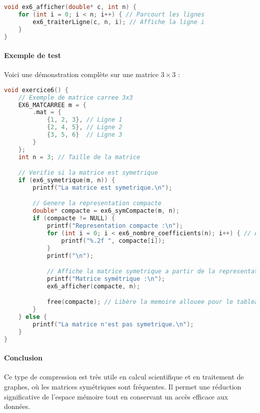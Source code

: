 \documentclass[a4paper,12pt]{article}
\begin{document}
\begin{lstlisting}[language=C, caption={Affichage d’une matrice symétrique}]
void ex6_afficher(double* c, int n) {
    for (int i = 0; i < n; i++) { // Parcourt les lignes
        ex6_traiterLigne(c, n, i); // Affiche la ligne i
    }
}

\end{lstlisting}

\paragraph{Exemple de test}

Voici une démonstration complète sur une matrice $3 \times 3$ :

\begin{lstlisting}[language=C, caption={Fonction de test}]
void exercice6() {
    // Exemple de matrice carree 3x3
    EX6_MATCARREE m = {
        .mat = {
            {1, 2, 3}, // Ligne 1
            {2, 4, 5}, // Ligne 2
            {3, 5, 6}  // Ligne 3
        }
    };
    int n = 3; // Taille de la matrice

    // Verifie si la matrice est symetrique
    if (ex6_symetrique(m, n)) {
        printf("La matrice est symetrique.\n");

        // Genere la representation compacte
        double* compacte = ex6_symCompacte(m, n);
        if (compacte != NULL) {
            printf("Representation compacte :\n");
            for (int i = 0; i < ex6_nombre_coefficients(n); i++) { // Affiche le tableau compact
                printf("%.2f ", compacte[i]);
            }
            printf("\n");

            // Affiche la matrice symetrique a partir de la representation compacte
            printf("Matrice symétrique :\n");
            ex6_afficher(compacte, n);

            free(compacte); // Libère la memoire allouee pour le tableau compact
        }
    } else {
        printf("La matrice n'est pas symetrique.\n");
    }
}
\end{lstlisting}

\paragraph{Conclusion}

Ce type de compression est très utile en calcul scientifique et en traitement de graphes, où les matrices symétriques sont fréquentes. Il permet une réduction significative de l’espace mémoire tout en conservant un accès efficace aux données.
\end{document}
